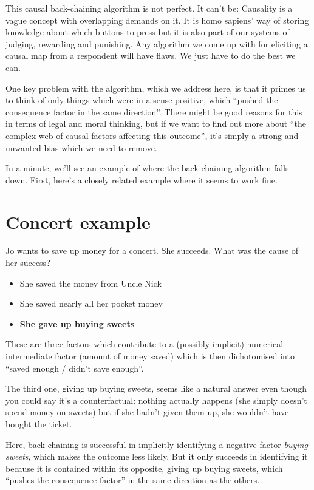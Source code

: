 \documentclass[
]{book}
\providecommand{\tightlist}{%
  \setlength{\itemsep}{0pt}\setlength{\parskip}{0pt}}
\begin{document}
This causal back-chaining algorithm is not perfect. It can't be: Causality is a vague concept with overlapping demands on it. It is homo sapiens' way of storing knowledge about which buttons to press but it is also part of our systems of judging, rewarding and punishing. Any algorithm we come up with for eliciting a causal map from a respondent will have flaws. We just have to do the best we can.

One key problem with the algorithm, which we address here, is that it primes us to think of only things which were in a sense positive, which ``pushed the consequence factor in the same direction''. There might be good reasons for this in terms of legal and moral thinking, but if we want to find out more about ``the complex web of causal factors affecting this outcome'', it's simply a strong and unwanted bias which we need to remove.

In a minute, we'll see an example of where the back-chaining algorithm falls down. First, here's a closely related example where it seems to work fine.

\hypertarget{concert-example}{%
\section{Concert example}\label{concert-example}}

Jo wants to save up money for a concert. She succeeds. What was the cause of her success?

\begin{itemize}
\tightlist
\item
  She saved the money from Uncle Nick
\item
  She saved nearly all her pocket money
\item
  \textbf{She gave up buying sweets}
\end{itemize}

These are three factors which contribute to a (possibly implicit) numerical intermediate factor (amount of money saved) which is then dichotomised into ``saved enough / didn't save enough''.

The third one, giving up buying sweets, seems like a natural answer even though you could say it's a counterfactual: nothing actually happens (she simply doesn't spend money on sweets) but if she hadn't given them up, she wouldn't have bought the ticket.

Here, back-chaining is successful in implicitly identifying a negative factor \emph{buying sweets}, which makes the outcome less likely. But it only succeeds in identifying it because it is contained within its opposite, giving up buying sweets, which ``pushes the consequence factor'' in the same direction as the others.
\end{document}

